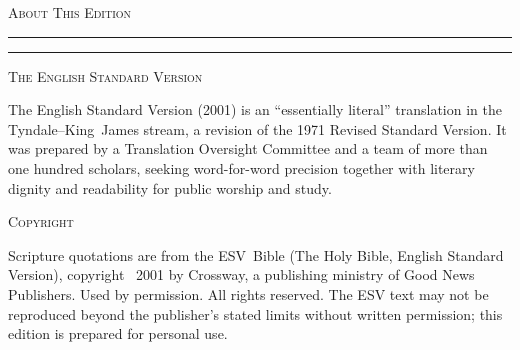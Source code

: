 \clearpage
\thispagestyle{empty}%
\null\vspace*{16mm}
\begin{center}
  {\Large\booktitlefont\scshape About This Edition\par}
  \vspace{3pt}
  {\color{gospels!70}\rule{28mm}{0.4pt}\enspace\rule{28mm}{0.4pt}\par}
\end{center}
\vspace{9mm}
\begin{center}\begin{minipage}{0.74\textwidth}
\setlength{\parskip}{6pt plus 2pt}\small

{\booktitlefont\scshape The English Standard Version}\par
The English Standard Version (2001) is an ``essentially literal'' translation in
the Tyndale--King~James stream, a revision of the 1971 Revised Standard Version.
It was prepared by a Translation Oversight Committee and a team of more than one
hundred scholars, seeking word-for-word precision together with literary
dignity and readability for public worship and study.

\medskip
{\booktitlefont\scshape Copyright}\par
Scripture quotations are from the ESV\textregistered\ Bible (The Holy Bible,
English Standard Version\textregistered), copyright \textcopyright~2001 by
Crossway, a publishing ministry of Good News Publishers. Used by permission. All
rights reserved. The ESV text may not be reproduced beyond the publisher's
stated limits without written permission; this edition is prepared for personal
use.


\end{minipage}\end{center}
\vfill
\clearpage
